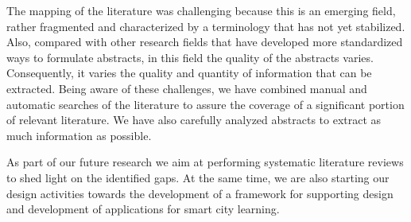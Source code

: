 The mapping of the literature was challenging because this is an emerging field, rather fragmented and characterized by a terminology that has not yet stabilized. Also, compared with other research fields that have developed more standardized ways to formulate abstracts, in this field the quality of the abstracts varies. Consequently, it varies the quality and quantity of information that can be extracted. Being aware of these challenges, we have combined manual and automatic searches of the literature to assure the coverage of a significant portion of relevant literature. We have also carefully analyzed abstracts to extract as much information as possible. 

As part of our future research we aim at performing systematic literature reviews to shed light on the identified gaps. At the same time, we are also starting our design activities towards the development of a framework for supporting design and development of applications for smart city learning.